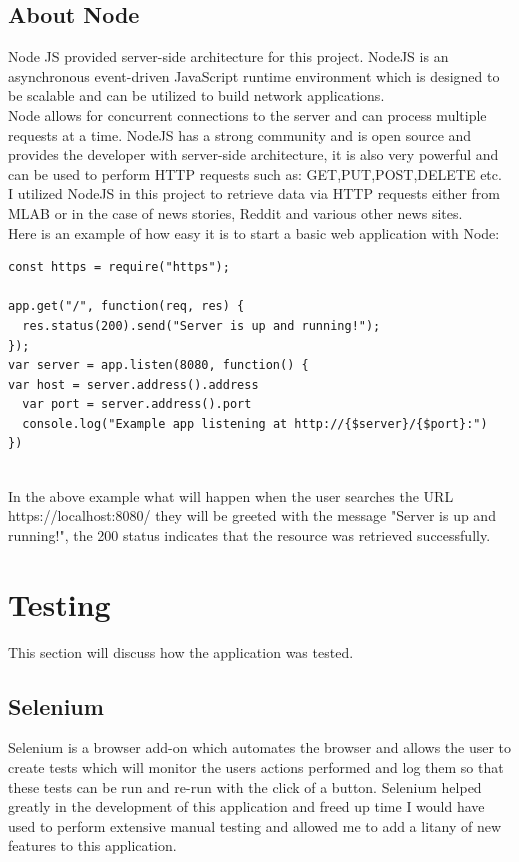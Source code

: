 \subsection{About Node}
Node JS provided server-side architecture for this project.  NodeJS is an asynchronous event-driven JavaScript runtime environment which is designed to be scalable and can be utilized to build network applications\cite{Node}.
\\
Node allows for concurrent connections to the server and can process multiple requests at a time.  NodeJS has a strong community and is open source and provides the developer with server-side architecture, it is also very powerful and can be used to perform HTTP requests such as: GET,PUT,POST,DELETE etc.
\\
 I utilized NodeJS in this project to retrieve data via HTTP requests either from MLAB or in the case of news stories, Reddit and various other news sites.
\\
Here is an example of how easy it is to start a basic web application with Node:
\\
\begin{verbatim}
const https = require("https");

app.get("/", function(req, res) {
  res.status(200).send("Server is up and running!");
});
var server = app.listen(8080, function() {
var host = server.address().address
  var port = server.address().port
  console.log("Example app listening at http://{$server}/{$port}:")
})
\end{verbatim}
\\
In the above example what will happen when the user searches the URL https://localhost:8080/ they will be greeted with the message "Server is up and running!", the 200 status indicates that the resource was retrieved successfully.
\section{Testing}
This section will discuss how the application was tested.
\subsection{Selenium}
Selenium is a browser add-on which automates the browser and allows the user to create tests which will monitor the users actions performed and log them so that these tests can be run and re-run with the click of a button.  Selenium helped greatly in the development of this application and freed up time I would have used to perform extensive manual testing and allowed me to add a litany of new features to this application.
